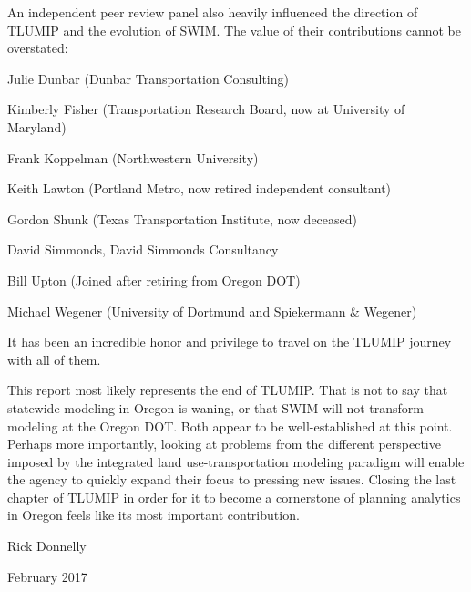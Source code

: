 An independent peer review panel also heavily influenced the direction of TLUMIP and the evolution of SWIM. The value of their contributions cannot be overstated:

\begin{description}\itemsep-3.5pt
\item \hspace{0.4in}Julie Dunbar (Dunbar Transportation Consulting)
\item \hspace{0.4in}Kimberly Fisher (Transportation Research Board, now at University of Maryland)
\item \hspace{0.4in}Frank Koppelman (Northwestern University)
\item \hspace{0.4in}Keith Lawton (Portland Metro, now retired independent consultant)
\item \hspace{0.4in}Gordon Shunk (Texas Transportation Institute, now deceased)
\item \hspace{0.4in}David Simmonds, David Simmonds Consultancy
\item \hspace{0.4in}Bill Upton (Joined after retiring from Oregon DOT)
\item \hspace{0.4in}Michael Wegener (University of Dortmund and Spiekermann \& Wegener)
\end{description}

It has been an incredible honor and privilege to travel on the TLUMIP journey with all of them. 

This report most likely represents the end of TLUMIP. That is not to say that statewide modeling in Oregon is waning, or that SWIM will not transform modeling at the Oregon DOT. Both appear to be well-established at this point. Perhaps more importantly, looking at problems from the different perspective imposed by the integrated land use-transportation modeling paradigm will enable the agency to quickly expand their focus to pressing new issues. Closing the last chapter of TLUMIP in order for it to become a cornerstone of planning analytics in Oregon feels like its most important contribution.

{
\vspace{14pt}
\setlength\parindent{4.5in}
Rick Donnelly

February 2017
}
